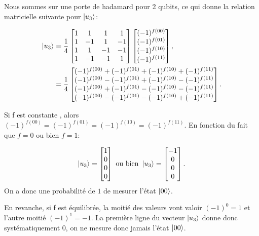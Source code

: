 Nous sommes sur une porte de hadamard pour 2 qubits, ce qui donne
la relation matricielle suivante pour $\ket{u_3}$:

\begin{align}
\ket{u_3} &=
\frac{1}{4} 
\begin{bmatrix}
  1 & 1 & 1 & 1 \\
  1 & -1 & 1 & -1 \\
  1 & 1 & -1 & -1 \\
  1 & -1 & -1 & 1 \\
\end{bmatrix}
\begin{bmatrix}
  (-1)^{f(00)} \\ (-1)^{f(01)} \\ (-1)^{f(10)} \\ (-1)^{f(11)}
\end{bmatrix} , \nonumber \\ 
 &= \frac{1}{4} 
\begin{bmatrix}
  (-1)^{f(00)} + (-1)^{f(01)} + (-1)^{f(10)} + (-1)^{f(11)} \\
  (-1)^{f(00)} - (-1)^{f(01)} + (-1)^{f(10)} - (-1)^{f(11)} \\
  (-1)^{f(00)} + (-1)^{f(01)} - (-1)^{f(10)} - (-1)^{f(11)} \\
  (-1)^{f(00)} - (-1)^{f(01)} - (-1)^{f(10)} + (-1)^{f(11)} \\
\end{bmatrix}.
\end{align}

Si f est constante , alors
$(-1)^{f(00)} = (-1)^{f(01)} = (-1)^{f(10)} = (-1)^{f(11)}$. En
fonction du fait que $f=0$ ou bien $f=1$:

\begin{equation}
  \label{eq:6}
\ket{u_3}=
\begin{bmatrix}
  1 \\ 0 \\ 0 \\ 0
\end{bmatrix}  \text{ ou bien }
\ket{u_3}=
\begin{bmatrix}
  -1 \\ 0 \\ 0 \\ 0
\end{bmatrix}.
\end{equation}
On a donc une probabilité de $1$ de mesurer l'état $\ket{00}$.

En revanche, si f est équilibrée, la moitié des valeurs vont
valoir $(-1)^{0} = 1$ et l'autre moitié $(-1)^{1} = -1$. La première
ligne du vecteur $\ket{u_3}$ donne donc systématiquement 0, on ne mesure donc
jamais l'état $\ket{00}$.

